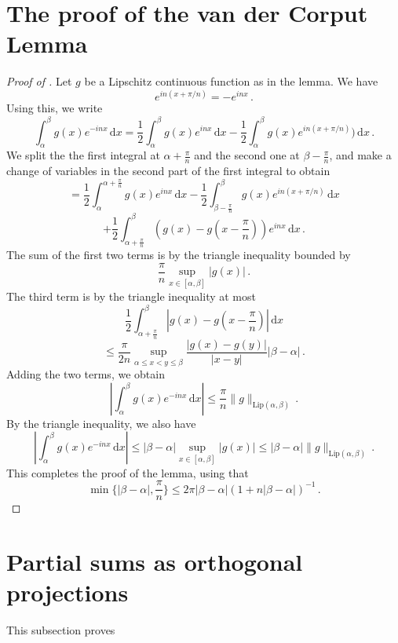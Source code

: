 \section{The proof of the van der Corput Lemma}
\label{10vandercorput}

\begin{proof}[Proof of ]
Let $g$ be a Lipschitz continuous function as in the lemma. We have
$$
    e^{in(x + \pi/n)} = -e^{inx}\,.
$$
Using this, we write
$$
    \int_\alpha^\beta g(x) e^{-inx} \, \mathrm{d}x
    = \frac{1}{2} \int_\alpha^\beta g(x) e^{inx} \, \mathrm{d}x - \frac{1}{2} \int_\alpha^\beta g(x) e^{in(x + \pi/n)}) \, \mathrm{d}x\,.
$$
We split the the first integral at $\alpha + \frac{\pi}{n}$ and the second one at $\beta - \frac{\pi}{n}$, and make a change of variables in the second part of the first integral to obtain
$$
    = \frac{1}{2} \int_{\alpha}^{\alpha + \frac{\pi}{n}} g(x) e^{inx} \, \mathrm{d}x - \frac{1}{2} \int_{\beta - \frac{\pi}{n}}^{\beta} g(x) e^{in(x + \pi/n)} \, \mathrm{d}x
$$
$$
    + \frac{1}{2} \int_{\alpha + \frac{\pi}{n}}^{\beta} (g(x) - g(x - \frac{\pi}{n})) e^{inx} \, \mathrm{d}x\,.
$$
The sum of the first two terms is by the triangle inequality bounded by
$$
    \frac{\pi}{n} \sup_{x \in [\alpha,\beta]} |g(x)|\,.
$$
The third term is by the triangle inequality at most
$$
    \frac{1}{2} \int_{\alpha + \frac{\pi}{n}}^\beta |g(x) - g(x - \frac{\pi}{n})| \, \mathrm{d}x
$$
$$
    \le \frac{\pi}{2n} \sup_{\alpha \le x < y \le \beta} \frac{|g(x) - g(y)|}{|x-y|} |\beta-\alpha|\,.
$$
Adding the two terms, we obtain
$$
    \left|\int_\alpha^\beta g(x) e^{-inx} \, \mathrm{d}x\right| \le \frac{\pi}{n} \|g\|_{\mathrm{Lip}(\alpha,\beta)}\,.
$$
By the triangle inequality, we also have
$$
    \left|\int_\alpha^\beta g(x) e^{-inx} \, \mathrm{d}x\right| \le |\beta -\alpha| \sup_{x \in [\alpha,\beta]} |g(x)| \le |\beta-\alpha| \|g\|_{\mathrm{Lip}(\alpha,\beta)}\,.
$$
This completes the proof of the lemma, using that
$$
    \min\{|\beta-\alpha|, \frac{\pi}{n}\} \le 2 \pi |\beta-\alpha|(1 + n|\beta-\alpha|)^{-1}\,.
$$
\end{proof}




\section{Partial sums as orthogonal projections}
\label{10projection}

This subsection proves 






